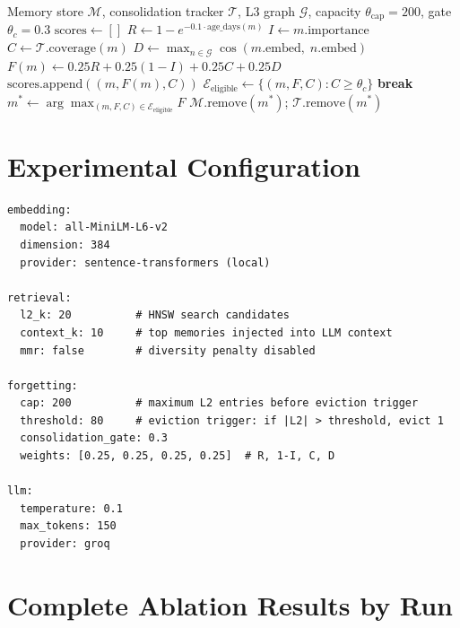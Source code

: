 \documentclass{article}
\begin{document}
\begin{algorithm}[h]
\caption{CA-Ours — Complete Forgetting Engine}
\label{alg:full}
\begin{algorithmic}[1]
\REQUIRE Memory store $\mathcal{M}$, consolidation tracker $\mathcal{T}$,
         L3 graph $\mathcal{G}$, capacity $\theta_{\text{cap}}=200$, gate $\theta_c=0.3$
  \STATE $\text{scores} \leftarrow []$
    \STATE $R \leftarrow 1 - e^{-0.1 \cdot \text{age\_days}(m)}$
    \STATE $I \leftarrow m.\text{importance}$
    \STATE $C \leftarrow \mathcal{T}.\text{coverage}(m)$
    \STATE $D \leftarrow \max_{n \in \mathcal{G}} \cos(m.\text{embed},\; n.\text{embed})$
    \STATE $F(m) \leftarrow 0.25 R + 0.25(1-I) + 0.25 C + 0.25 D$
    \STATE $\text{scores}.\text{append}((m, F(m), C))$
  \ENDFOR
  \STATE $\mathcal{E}_{\text{eligible}} \leftarrow \{(m, F, C) : C \geq \theta_c\}$
    \STATE \textbf{break} \quad {}
  \ENDIF
  \STATE $m^* \leftarrow \arg\max_{(m,F,C) \in \mathcal{E}_{\text{eligible}}} F$
  \STATE $\mathcal{M}.\text{remove}(m^*)$; \quad $\mathcal{T}.\text{remove}(m^*)$
\ENDWHILE
\end{algorithmic}
\end{algorithm}

\section{Experimental Configuration}
\label{app:config}

\begin{verbatim}
embedding:
  model: all-MiniLM-L6-v2
  dimension: 384
  provider: sentence-transformers (local)

retrieval:
  l2_k: 20          # HNSW search candidates
  context_k: 10     # top memories injected into LLM context
  mmr: false        # diversity penalty disabled

forgetting:
  cap: 200          # maximum L2 entries before eviction trigger
  threshold: 80     # eviction trigger: if |L2| > threshold, evict 1
  consolidation_gate: 0.3
  weights: [0.25, 0.25, 0.25, 0.25]  # R, 1-I, C, D

llm:
  temperature: 0.1
  max_tokens: 150
  provider: groq
\end{verbatim}

\section{Complete Ablation Results by Run}
\label{app:ablation_runs}
\end{document}
